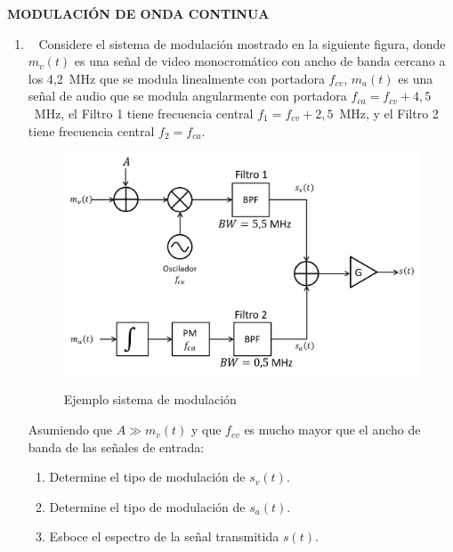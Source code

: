 \pagebreak
\begin{center}
\textbf{MODULACIÓN DE ONDA CONTINUA}
\\

\end{center}
\begin{enumerate}

\item~ Considere el sistema de modulación mostrado en la siguiente figura, donde $m_v(t)$ es una señal de video monocromático con ancho de banda cercano a los 4,2~MHz que se modula linealmente con portadora $f_{cv}$, $m_a(t)$ es una señal de audio que se modula angularmente con portadora $f_{ca}=f_{cv}+4,5$~MHz, el Filtro 1 tiene frecuencia central $f_{1}=f_{cv}+2,5$~MHz, y el Filtro 2 tiene frecuencia central $f_{2}=f_{ca}$.\\


\begin{figure}[h!]
	\captionsetup{justification = raggedright, singlelinecheck = false}
	\caption{Ejemplo sistema de modulación} 
	\centering
	\includegraphics[scale=0.5]{Imagenes/ntscdiagram.png}
	\label{fig:ntscdiagram}
\end{figure}

Asumiendo que $A\gg m_v(t)$ y que $f_{cv}$ es mucho mayor que el ancho de banda de las señales de entrada:
\begin{enumerate}
	\item Determine el tipo de modulación de $s_v(t)$.
	
	\item Determine el tipo de modulación de $s_a(t)$.
	\item Esboce el espectro de la señal transmitida $s(t)$.
	

\end{enumerate}
\end{enumerate}
